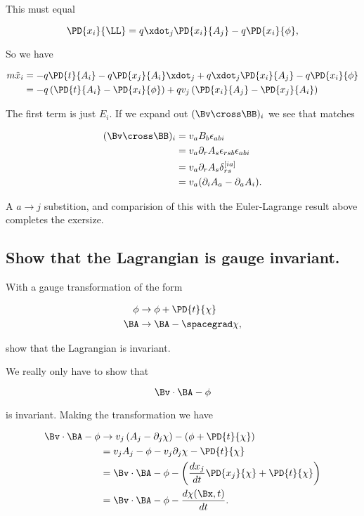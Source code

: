 This must equal

\begin{equation}\label{eqn:classicalMechanicsPs1:n}
\PD{x_i}{\LL} = q \xdot_j \PD{x_i}{A_j} - q \PD{x_i}{\phi},
\end{equation}

So we have

\begin{align*}
m \ddot{x}_i 
&= 
-q \PD{t}{A_i}
- q \PD{x_j}{A_i} \xdot_j
+q \xdot_j \PD{x_i}{A_j} - q \PD{x_i}{\phi} \\
&=
-q \left( \PD{t}{A_i} - \PD{x_i}{\phi} \right)
+q v_j \left( \PD{x_i}{A_j} - \PD{x_j}{A_i} \right)
\end{align*}

The first term is just $E_i$.  If we expand out $(\Bv \cross \BB)_i$ we see that matches

\begin{align*}
(\Bv \cross \BB)_i
&=
v_a B_b \epsilon_{abi} \\
&=
v_a \partial_r A_s \epsilon_{rsb} \epsilon_{abi} \\
&=
v_a \partial_r A_s \delta_{rs}^{[ia]} \\
&=
v_a (\partial_i A_a - \partial_a A_i).
\end{align*}

A $a \rightarrow j$ substition, and comparision of this with the Euler-Lagrange result above completes the exersize.

\subsection{Show that the Lagrangian is gauge invariant.}

With a gauge transformation of the form

\begin{align}\label{eqn:classicalMechanicsPs1:n}
\phi &\rightarrow \phi + \PD{t}{\chi} \\
\BA &\rightarrow \BA - \spacegrad \chi,
\end{align}

show that the Lagrangian is invariant.

We really only have to show that 

\begin{equation}\label{eqn:classicalMechanicsPs1:n}
\Bv \cdot \BA - \phi
\end{equation}

is invariant.  Making the transformation we have

\begin{align*}
\Bv \cdot \BA - \phi
&\rightarrow 
v_j \left(A_j - \partial_j \chi \right) - \left(\phi + \PD{t}{\chi} \right) \\
&=
v_j A_j - \phi - v_j \partial_j \chi - \PD{t}{\chi} \\
&=
\Bv \cdot \BA - \phi
- \left( \frac{d x_j}{dt} \PD{x_j}{\chi} + \PD{t}{\chi} \right) \\
&=
\Bv \cdot \BA - \phi
- \frac{d \chi(\Bx, t)}{dt}.
\end{align*}

